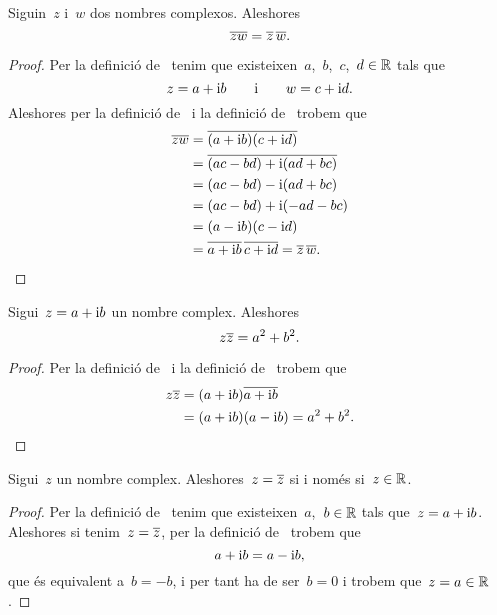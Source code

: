 \documentclass[../Apunts.tex]{subfiles}
\begin{document}
	\begin{proposition}
		\label{prop:el conjugat del producte és el producte de conjugats}
		Siguin~\(z\) i~\(w\) dos nombres complexos.
		Aleshores
		\[\overline{zw}=\overline{z}\,\overline{w}.\]
	\end{proposition}
	\begin{proof}
		Per la definició de~ tenim que
		existeixen~\(a\),~\(b\),~\(c\),~\(d\in\mathbb{R}\) tals que
		\[z=a+\mathrm{i} b\qquad\text{i}\qquad w=c+\mathrm{i} d.\]
		Aleshores per la definició de~
		i la definició de~ trobem que
		\begin{align*}
			\overline{zw}
			&=\overline{(a+\mathrm{i} b)(c+\mathrm{i} d)} \\
			&=\overline{(ac-bd)+\mathrm{i}(ad+bc)} \\
			&=(ac-bd)-\mathrm{i}(ad+bc) \\
			&=(ac-bd)+\mathrm{i}(-ad-bc) \\
			&=(a-\mathrm{i} b)(c-\mathrm{i} d) \\
			&=\overline{a+\mathrm{i} b}\,\overline{c+\mathrm{i} d}
			=\overline{z}\,\overline{w}.
			\qedhere
		\end{align*}
	\end{proof}
	\begin{proposition}
		\label{prop:el producte d'un nombre complex pel seu conjugat és la %
		suma dels quadrats de la seva part real i imaginaria}
		Sigui~\(z=a+\mathrm{i} b\) un nombre complex.
		Aleshores
		\[z\overline{z}=a^{2}+b^{2}.\]
	\end{proposition}
	\begin{proof}
		Per la definició de~ i la
		definició de~ trobem que
		\begin{align*}
			z\overline{z}
			&=(a+\mathrm{i} b)\overline{a+\mathrm{i} b} \\
			&=(a+\mathrm{i} b)(a-\mathrm{i} b)
			=a^{2}+b^{2}.
			\qedhere
		\end{align*}
	\end{proof}
	\begin{proposition}
		\label{prop:un nombre complex és igual al seu conjugat %
		si i només si és un real}
		Sigui~\(z\) un nombre complex.
		Aleshores~\(z=\overline{z}\) si i només si~\(z\in\mathbb{R}\).
	\end{proposition}
	\begin{proof}
		Per la definició de~ tenim que
		existeixen~\(a\),~\(b\in\mathbb{R}\) tals que~\(z=a+\mathrm{i} b\).
		Aleshores si tenim~\(z=\overline{z}\), per la definició
		de~ trobem que
		\[a+\mathrm{i} b=a-\mathrm{i} b,\]
		que és equivalent a~\(b=-b\), i per tant ha de ser~\(b=0\)
		i trobem que~\(z=a\in\mathbb{R}\).
	\end{proof}
\end{document}
